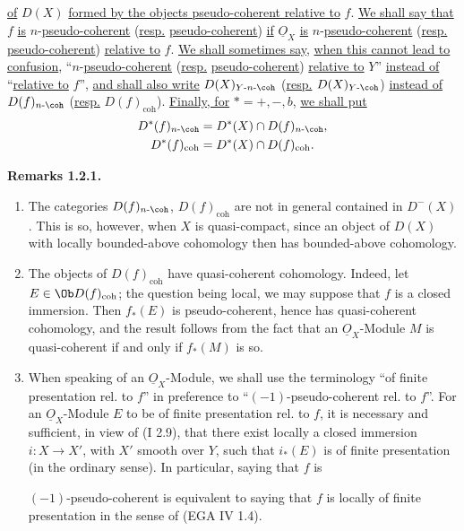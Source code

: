 \uline{of} \(D(X)\) \uline{formed by the objects pseudo-coherent relative to} \(f\). \uline{We shall say that} \(f\) \uline{is} \(n\)-\uline{pseudo-coherent} (\uline{resp.} \uline{pseudo-coherent}) \uline{if} \(\underline{O}_X\) \uline{is} \(n\)-\uline{pseudo-coherent} (\uline{resp.} \uline{pseudo-coherent}) \uline{relative to} \(f\). \uline{We shall sometimes say}, \uline{when this cannot lead to confusion}, ``\(n\)-\uline{pseudo-coherent} (\uline{resp.} \uline{pseudo-coherent}) \uline{relative to} \(Y\)'' \uline{instead of} ``\uline{relative to} \(f\)'', \uline{and shall also write} \(D(X)_{Y\text{-}n\text{-}\coh}\) (\uline{resp.} \(D(X)_{Y\text{-}\coh}\)) \uline{instead of} \(D(f)_{n\text{-}\coh}\) (\uline{resp.} \(D(f)_{\mathrm{coh}}\)). \uline{Finally, for} \(*=+,-,b\), \uline{we shall put}
\[
\begin{gathered}
  D^*(f)_{n\text{-}\coh}=D^*(X)\cap D(f)_{n\text{-}\coh},\\
  D^*(f)_{\mathrm{coh}}=D^*(X)\cap D(f)_{\mathrm{coh}}.
\end{gathered}
\]

\textbf{Remarks 1.2.1.}
\begin{enumerate}[label=\alph*)]
\item The categories \(D(f)_{n\text{-}\coh}\), \(D(f)_{\mathrm{coh}}\) are not in general contained in \(D^{-}(X)\). This is so, however, when \(X\) is quasi-compact, since an object of \(D(X)\) with locally bounded-above cohomology then has bounded-above cohomology.

\item The objects of \(D(f)_{\mathrm{coh}}\) have quasi-coherent cohomology. Indeed, let \(E\in\Ob D(f)_{\mathrm{coh}}\); the question being local, we may suppose that \(f\) is a closed immersion. Then \(f_*(E)\) is pseudo-coherent, hence has quasi-coherent cohomology, and the result follows from the fact that an \(\underline{O}_X\)-Module \(M\) is quasi-coherent if and only if \(f_*(M)\) is so.

\item When speaking of an \(\underline{O}_X\)-Module, we shall use the terminology ``of finite presentation rel. to \(f\)'' in preference to ``\((-1)\)-pseudo-coherent rel. to \(f\)''. For an \(\underline{O}_X\)-Module \(E\) to be of finite presentation rel. to \(f\), it is necessary and sufficient, in view of (I 2.9), that there exist locally a closed immersion \(i:X\to X'\), with \(X'\) smooth over \(Y\), such that \(i_*(E)\) is of finite presentation (in the ordinary sense). In particular, saying that \(f\) is

\((-1)\)-pseudo-coherent is equivalent to saying that \(f\) is locally of finite presentation in the sense of (EGA IV 1.4).
\end{enumerate}

